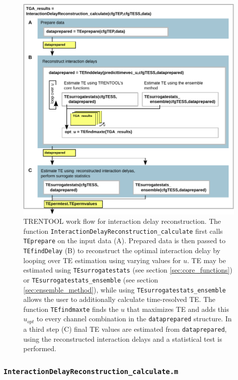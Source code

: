 \documentclass[a4paper,10pt]{article}
\begin{document}
\begin{figure}[H]	
	\centering	
 		\includegraphics[scale=0.90]{figures/TRENTOOL3_workflow_delayreconstruction.pdf}
	\caption[TRENTOOL work flow for interaction delay reconstruction]{TRENTOOL work flow for interaction delay reconstruction. The function \texttt{InteractionDelayReconstruction\_calculate} first calls \texttt{TEprepare} on the input data (A). Prepared data is then passed to \texttt{TEfindDelay} (B) to reconstruct the optimal interaction delay by looping over TE estimation using varying values for $u$. TE may be estimated using \texttt{TEsurrogatestats} (see section \ref{sec:core_functions}) or \texttt{TEsurrogatestats\_ensemble} (see section \ref{sec:ensemble_method}), while using \texttt{TEsurrogatestats\_ensemble} allows the user to additionally calculate time-resolved TE. The function \texttt{TEfindmaxte} finds the $u$ that maximizes TE and adds this $u_{opt}$ to every channel combination in the \texttt{dataprepared} structure. In a third step (C) final TE values are estimated from \texttt{dataprepared}, using the reconstructed interaction delays and a statistical test is performed.	
	}
	\label{fig:workflow_delayReconstruction}
\end{figure} 

\subsubsection{\texttt{InteractionDelayReconstruction\_calculate.m}} 
\end{document}
